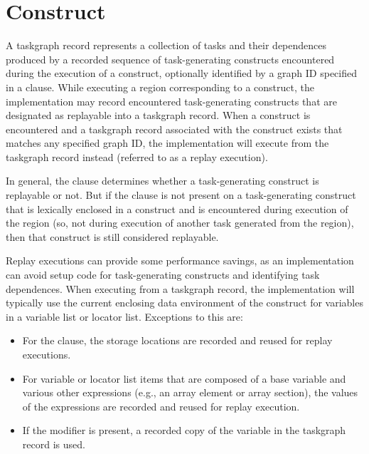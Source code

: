 \section{ Construct}

\label{sec:taskgraph}

A taskgraph record represents a collection of tasks and their dependences
produced by a recorded sequence of task-generating constructs encountered
during the execution of a  construct, optionally identified by
a graph ID specified in a  clause. While executing a region
corresponding to a  construct, the implementation may record
encountered task-generating constructs that are designated as replayable into a
taskgraph record. When a  construct is encountered and a
taskgraph record associated with the construct exists that matches any
specified graph ID, the implementation will execute from the taskgraph record
instead (referred to as a replay execution). 

In general, the  clause determines whether a task-generating
construct is replayable or not. But if the  clause is not
present on a task-generating construct that is lexically enclosed in a
 construct and is encountered during execution of the
 region (so, not during execution of another task generated
from the  region), then that construct is still considered
replayable.

Replay executions can provide some performance savings, as an implementation
can avoid setup code for task-generating constructs and identifying task
dependences. When executing from a taskgraph record, the implementation will
typically use the current enclosing data environment of the 
construct for variables in a variable list or locator list. Exceptions to this
are:

\begin{itemize}
\item For the  clause, the storage locations are recorded and
      reused for replay executions.

\item For variable or locator list items that are composed of a base variable and
      various other expressions (e.g., an array element or array section), the
        values of the expressions are recorded and reused for replay execution.

\item If the  modifier is present, a recorded copy of the variable
      in the taskgraph record is used.
\end{itemize}

